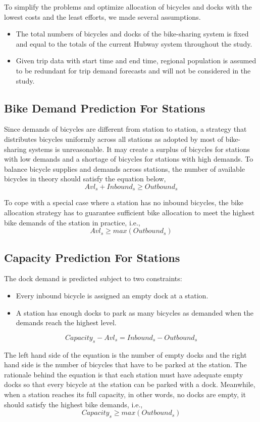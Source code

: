 \documentclass[journal, letterpaper]{IEEEtran}
\begin{document}
To simplify the problems and optimize allocation of bicycles and docks with the lowest costs and the least efforts, we made several assumptions.

\begin{itemize}
\item The total numbers of bicycles and docks of the bike-sharing system is fixed and equal to the totals of the current Hubway system throughout the study.
\item Given trip data with start time and end time, regional population is assumed to be redundant for trip demand forecasts and will not be considered in the study.
\end{itemize} 
\subsection{Bike Demand Prediction For Stations}
Since demands of bicycles are different from station to station, a strategy that distributes bicycles uniformly across all stations as adopted by most of bike-sharing systems is unreasonable. It may create a surplus of bicycles for stations with low demands and a shortage of bicycles for stations with high demands. To balance bicycle supplies and demands across stations, the number of available bicycles in theory should satisfy the equation below,
$$Avl_{s} + Inbound_{s} \ge Outbound_{s}$$

To cope with a special case where a station has no inbound bicycles, the bike allocation strategy has to guarantee sufficient bike allocation to meet the highest bike demands of the station in practice, i.e.,
$$Avl_{s} \ge max(Outbound_{s})$$
\subsection{Capacity Prediction For Stations}
The dock demand is predicted subject to two constraints:
\begin{itemize}
\item Every inbound bicycle is assigned an empty dock at a station.
\item A station has enough docks to park as many bicycles as demanded when the demands reach the highest level.
\end{itemize}

$$Capacity_{s} - Avl_{s} = Inbound_{s} - Outbound_{s}$$

The left hand side of the equation is the number of empty docks and the right hand side is the number of bicycles that have to be parked at the station. The rationale behind the equation is that each station must have adequate empty docks so that every bicycle at the station can be parked with a dock. Meanwhile, when a station reaches its full capacity, in other words, no docks are empty, it should satisfy the highest bike demands, i.e., 
$$Capacity_{s} \ge max(Outbound_{s})$$
\end{document}
